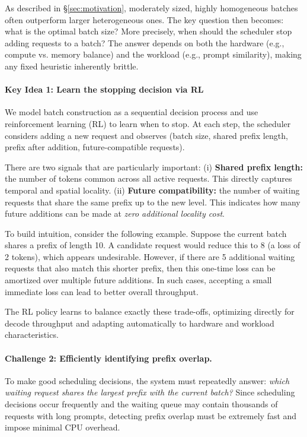 As described in \S\ref{sec:motivation}, moderately sized, highly homogeneous batches often outperform larger heterogeneous ones. The key question then becomes: what is the optimal batch size? More precisely, when should the scheduler stop adding requests to a batch? The answer depends on both the hardware (e.g., compute vs. memory balance) and the workload (e.g., prompt similarity), making any fixed heuristic inherently brittle.

\paragraph{Key Idea 1: Learn the stopping decision via RL}
We model batch construction as a sequential decision process and use reinforcement learning (RL) to learn when to stop. At each step, the scheduler considers adding a new request and observes (batch size, shared prefix length, prefix after addition, future-compatible requests).

There are two signals that are particularly important: (i) \textbf{Shared prefix length:} the number of tokens common across all active requests. This directly captures temporal and spatial locality. (ii) \textbf{Future compatibility:} the number of waiting requests that share the same prefix up to the new level. This indicates how many future additions can be made at \emph{zero additional locality cost}.

To build intuition, consider the following example. Suppose the current batch shares a prefix of length 10. A candidate request would reduce this to 8 (a loss of 2 tokens), which appears undesirable. However, if there are 5 additional waiting requests that also match this shorter prefix, then this one-time loss can be amortized over multiple future additions. In such cases, accepting a small immediate loss can lead to better overall throughput.

The RL policy learns to balance exactly these trade-offs, optimizing directly for decode throughput and adapting automatically to hardware and workload characteristics.

\paragraph{Challenge 2: Efficiently identifying prefix overlap.}
To make good scheduling decisions, the system must repeatedly answer: \emph{which waiting request shares the largest prefix with the current batch?} Since scheduling decisions occur frequently and the waiting queue may contain thousands of requests with long prompts, detecting prefix overlap must be extremely fast and impose minimal CPU overhead.

